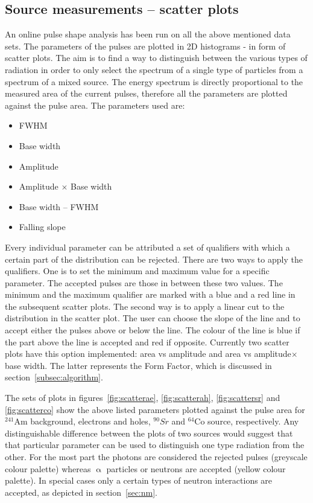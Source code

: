 \subsection{Source measurements -- scatter plots}
An online pulse shape analysis has been run on all the above mentioned data sets. The parameters of the pulses are plotted in 2D histograms - in form of scatter plots. The aim is to find a way to distinguish between the various types of radiation in order to only select the spectrum of a single type of particles from a spectrum of a mixed source. The energy spectrum is directly proportional to the measured area of the current pulses, therefore all the parameters are plotted against the pulse area. The parameters used are: 
\begin{itemize}
\item FWHM
\item Base width
\item Amplitude
\item Amplitude $\times$ Base width
\item Base width -- FWHM
\item Falling slope
\end{itemize}
Every individual parameter can be attributed a set of qualifiers with which a certain part of the distribution can be rejected. There are two ways to apply the qualifiers. One is to set the minimum and maximum value for a specific parameter. The accepted pulses are those in between these two values. The minimum and the maximum qualifier are marked with a blue and a red line in the subsequent scatter plots. The second way is to apply a linear cut to the distribution in the scatter plot. The user can choose the slope of the line and to accept either the pulses above or below the line. The colour of the line is blue if the part above the line is accepted and red if opposite. Currently two scatter plots have this option implemented: area vs amplitude and area vs amplitude$\times$base width. The latter represents the Form Factor, which is discussed in section~\ref{subsec:algorithm}.

The sets of plots in figures~\ref{fig:scatterae}, \ref{fig:scatterah}, \ref{fig:scattersr} and \ref{fig:scatterco} show the above listed parameters plotted against the pulse area for $^{241}$Am background, electrons and holes, $^{90}Sr$ and $^{64}$Co source, respectively. Any distinguishable difference between the plots of two sources would suggest that that particular parameter can be used to distinguish one type radiation from the other. For the most part the photons are considered the rejected pulses (greyscale colour palette) whereas $\upalpha$ particles or neutrons are accepted (yellow colour palette). In special cases only a certain types of neutron interactions are accepted, as depicted in section~\ref{sec:nm}.

